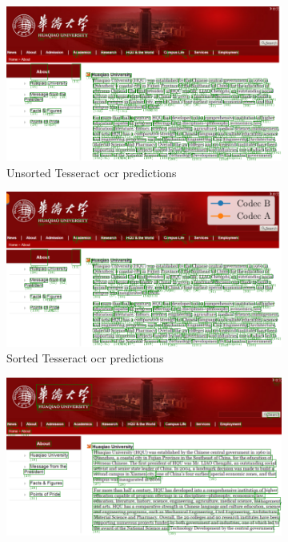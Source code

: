 
\begin{figure}
    \centering
    \begin{subfigure}[b]{0.45\textwidth}
        \includegraphics[width=\textwidth]{../images/bbox_order_tess.pdf}
        \caption{Unsorted Tesseract \gls{ocr} predictions}
        \label{fig:tess_pred}
    \end{subfigure}
    \begin{subfigure}[b]{0.45\textwidth}
        \includegraphics[width=\textwidth]{../images/bbox_order_tess_sorted.pdf}
        \caption{Sorted Tesseract \gls{ocr} predictions}
        \label{fig:tess_pred_sorted}
    \end{subfigure}
    \newline
    \hfill
    \begin{subfigure}[b]{0.45\textwidth}
        \includegraphics[width=\textwidth]{../images/bbox_order_ezocr.pdf}

\end{subfigure}
\end{figure}
